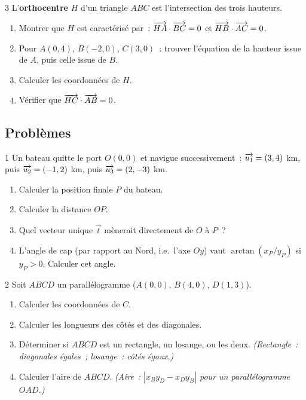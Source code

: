 \begin{exo}{3}
L'\textbf{orthocentre} $H$ d'un triangle $ABC$ est l'intersection
des trois hauteurs.
\begin{enumerate}
  \item Montrer que $H$ est caract\'eris\'e par~:
        $\overrightarrow{HA}\cdot\overrightarrow{BC}=0$ et $\overrightarrow{HB}\cdot\overrightarrow{AC}=0$.
  \item Pour $A(0,4)$, $B(-2,0)$, $C(3,0)$~:
        trouver l'\'equation de la hauteur issue de $A$,
        puis celle issue de $B$.
  \item Calculer les coordonn\'ees de $H$.
  \item V\'erifier que $\overrightarrow{HC}\cdot\overrightarrow{AB}=0$.
\end{enumerate}
\end{exo}

\subsection*{Probl\`emes}

\begin{probleme}{1}
Un bateau quitte le port $O(0,0)$ et navigue successivement~:
$\overrightarrow{u_1}=(3,4)$ km, puis $\overrightarrow{u_2}=(-1,2)$ km, puis $\overrightarrow{u_3}=(2,-3)$ km.
\begin{enumerate}
  \item Calculer la position finale $P$ du bateau.
  \item Calculer la distance $OP$.
  \item Quel vecteur unique $\vec{t}$ m\`enerait directement de $O$ \`a $P$~?
  \item L'angle de cap (par rapport au Nord, i.e.\ l'axe $Oy$) vaut
        $\arctan(x_P/y_P)$ si $y_P>0$. Calculer cet angle.
\end{enumerate}
\end{probleme}

\begin{probleme}{2}
Soit $ABCD$ un parall\'elogramme ($A(0,0)$, $B(4,0)$, $D(1,3)$).
\begin{enumerate}
  \item Calculer les coordonn\'ees de $C$.
  \item Calculer les longueurs des c\^ot\'es et des diagonales.
  \item D\'eterminer si $ABCD$ est un rectangle, un losange, ou les deux.
        \emph{(Rectangle~: diagonales \'egales~; losange~: c\^ot\'es \'egaux.)}
  \item Calculer l'aire de $ABCD$.
        \emph{(Aire~: $|x_B y_D - x_D y_B|$ pour un parall\'elogramme $OAD$.)}
\end{enumerate}
\end{probleme}

